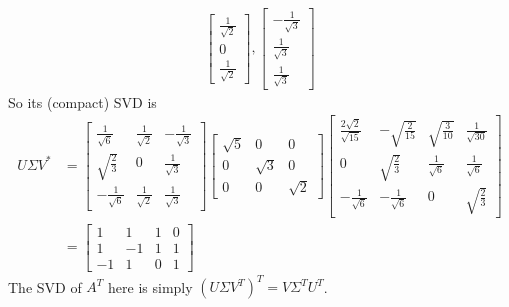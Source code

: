 \begin{Answer}
\begin{align*}
\begin{bmatrix}
\frac{1}{\sqrt{2}}\\ 
0\\ 
\frac{1}{\sqrt{2}}
\end{bmatrix},
\begin{bmatrix}
-\frac{1}{\sqrt{3}}\\ 
\frac{1}{\sqrt{3}}\\ 
\frac{1}{\sqrt{3}}
\end{bmatrix}
\end{align*}
So its (compact) SVD is
\begin{align*}
U\Sigma V^* &= 
\begin{bmatrix}
\frac{1}{\sqrt{6}} & \frac{1}{\sqrt{2}} & -\frac{1}{\sqrt{3}}\\  
\sqrt{\frac{2}{3}} & 0 & \frac{1}{\sqrt{3}}\\   
-\frac{1}{\sqrt{6}} & \frac{1}{\sqrt{2}} & \frac{1}{\sqrt{3}}
\end{bmatrix}
\begin{bmatrix}
\sqrt{5} & 0 & 0 \\
0 & \sqrt{3} & 0 \\
0 & 0 & \sqrt{2}
\end{bmatrix}
\begin{bmatrix}
\frac{2\sqrt{2}}{\sqrt{15}}&-\sqrt{\frac{2}{15}}&\sqrt{\frac{3}{10}}&\frac{1}{\sqrt{30}}\\ 
0&\sqrt{\frac{2}{3}}&\frac{1}{\sqrt{6}}&\frac{1}{\sqrt{6}}\\ 
-\frac{1}{\sqrt{6}}&-\frac{1}{\sqrt{6}}&0&\sqrt{\frac{2}{3}}
\end{bmatrix} \\
&=
\begin{bmatrix}
1&1&1&0\\ 
1&-1&1&1\\ 
-1&1&0&1
\end{bmatrix}
\end{align*}
The SVD of $A^T$ here is simply $(U\Sigma V^T)^T = V\Sigma^TU^T$.
\end{Answer}

